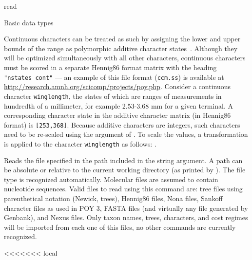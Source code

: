 \begin{command}{read}{}
\begin{arguments}
\begin{argumentgroup}{Basic data types}
            \begin{statement}
                Continuous characters can be treated as such by assigning the lower
                and upper bounds of the range as polymorphic additive character 
                states~\cite{goloboffetal2006}.    Although they will be optimized 
                simultaneously with all other characters, continuous characters 
                must be scored in a separate Hennig86 format matrix with the heading 
                \texttt{ "nstates cont"} --- an example of this file format (\texttt{ccm.ss})
                is available at \url{http://research.amnh.org/scicomp/projects/poy.php}.
                Consider a continuous character  \texttt{winglength}, the states of 
                which are ranges of measurements in hundredth of a millimeter,  
                for example 2.53-3.68 mm for a given terminal. A corresponding 
                character state in the  additive character matrix (in Hennig86 format) is 
                \texttt{[253,368]}. Because additive characters are integers, such 
                characters need to be re-scaled using the  
                argument of .  To scale the values, a transformation 
                is applied to the character \texttt{winglength} as follows:
                .
            \end{statement}
             
                {Reads the file specified in the path included in the string argument.
                A path can be absolute or relative to the current working
                directory (as printed by ). The file type is
                recognized automatically.  Molecular files are assumed to
                contain nucleotide sequences. Valid files to read using this
                command are: tree files using parenthetical notation (Newick,
                \poy trees), Hennig86 files, Nona files, Sankoff character files
                as used in POY 3, FASTA files (and virtually any file generated
                by Genbank), and Nexus files. Only taxon names, trees,
                characters, and cost regimes will be imported from each one of
                this files, no other commands are currently recognized.}
                {}
        \end{argumentgroup}
     
<<<<<<< local


\end{arguments}
\end{command}
